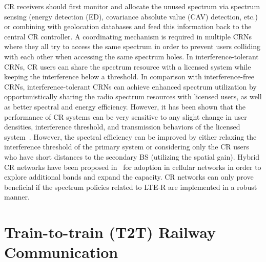 CR receivers should first monitor and allocate the unused spectrum via spectrum sensing (energy detection (ED), covariance absolute value (CAV) detection, etc.)~\cite{wyglinski2009cognitive} or combining with geolocation databases and feed this information back to the central CR controller. A coordinating mechanism is required in multiple CRNs where they all try to access the same spectrum in order to prevent users colliding with each other when accessing the same spectrum holes. In interference-tolerant CRNs, CR users can share the spectrum resource with a licensed system while keeping the interference below a threshold. In comparison with interference-free CRNs, interference-tolerant CRNs can achieve enhanced spectrum utilization by opportunistically sharing the radio spectrum resources with licensed users, as well as better spectral and energy efficiency. However, it has been shown that the performance of CR systems can be very sensitive to any slight change in user densities, interference threshold, and transmission behaviors of the licensed system~\cite{haykin2005cognitive}. However, the spectral efficiency can be improved by either relaxing the interference threshold of the primary system or considering only the CR users who have short distances to the secondary BS (utilizing the spatial gain). Hybrid CR networks have been proposed in~\cite{hong2010capacity} for adoption in cellular networks in order to explore additional bands and expand the capacity. CR networks can only prove beneficial if the spectrum policies related to LTE-R are implemented in a robust manner. 

\section{Train-to-train (T2T) Railway Communication}

